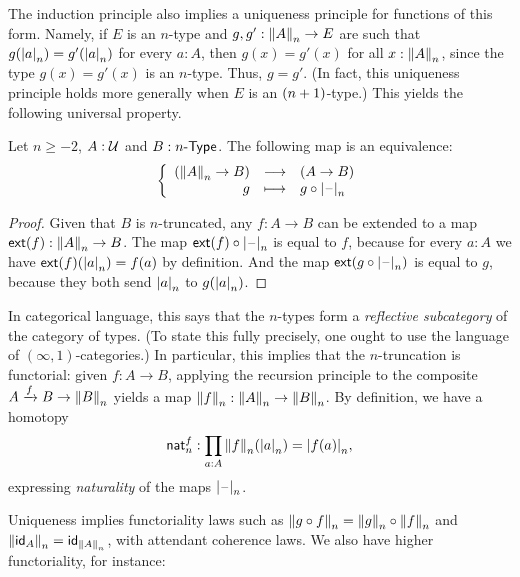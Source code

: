 The induction principle also implies a uniqueness principle for functions of this form.
%
Namely, if $E$ is an $n$-type and $g,g':\trunc nA\to{}E$ are such
that $g(\tproj na)=g'(\tproj na)$ for every $a:A$, then $g(x)=g'(x)$ for all $x:\trunc nA$, since the type $g(x)=g'(x)$ is an $n$-type.
Thus, $g=g'$.
(In fact, this uniqueness principle holds more generally when $E$ is an $\nplusone$-type.)
This yields the following universal property.

\begin{lem}\label{thm:trunc-reflective}
  Let $n\ge-2$, $A:\type$ and $B:\typele{n}$. The following map is an
  equivalence:
  \[\function{(\trunc nA\to{}B)}{(A\to{}B)}{g}{g\circ\tprojf n}\]
\end{lem}

\begin{proof}
  Given that $B$ is $n$-truncated, any $f:A\to{}B$ can be extended to a map $\extend{f}:\trunc nA\to{}B$.
  The map $\extend{f}\circ\tprojf n$ is equal to $f$, because for every $a:A$ we have $\extend{f}(\tproj na)=f(a)$ by definition.
  And the map $\extend{g\circ\tprojf n}$ is equal to $g$, because they both send $\tproj na$ to $g(\tproj na)$.
\end{proof}

In categorical language, this says that the $n$-types form a \emph{reflective subcategory} of the category of types.
%
(To state this fully precisely, one ought to use the language of $(\infty,1)$-categories.)
%
In particular, this implies that the $n$-truncation is functorial:
given $f:A\to B$, applying the recursion principle to the composite $A\xrightarrow{f} B \to \trunc n B$ yields a map $\trunc n f: \trunc n A \to \trunc n B$.
By definition, we have a homotopy
\begin{equation}
  \mathsf{nat}^f_n : \prd{a:A} \trunc n f(\tproj n a) = \tproj n {f(a)},\label{eq:trunc-nat}
\end{equation}
expressing \emph{naturality} of the maps $\tprojf n$.

Uniqueness implies functoriality laws such as $\trunc n {g\circ f} = \trunc n g \circ \trunc n f$ and $\trunc n{\idfunc[A]} = \idfunc[\trunc n A]$, with attendant coherence laws.
We also have higher functoriality, for instance:

